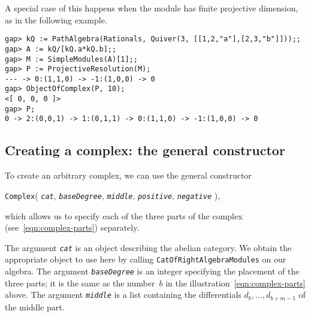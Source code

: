 \documentclass{amsart}
\theoremstyle{definition}
\newcommand{\code}[1]{\texttt{#1}}
\newcommand{\Arg}[1]{\texttt{\textit{#1}}}
\theoremstyle{theoretic}
\begin{document}
A special case of this happens when the module has finite projective
dimension, as in the following example.

\begin{verbatim}
gap> kQ := PathAlgebra(Rationals, Quiver(3, [[1,2,"a"],[2,3,"b"]]));;
gap> A := kQ/[kQ.a*kQ.b];;
gap> M := SimpleModules(A)[1];;
gap> P := ProjectiveResolution(M);
--- -> 0:(1,1,0) -> -1:(1,0,0) -> 0
gap> ObjectOfComplex(P, 10);
<[ 0, 0, 0 ]>
gap> P;
0 -> 2:(0,0,1) -> 1:(0,1,1) -> 0:(1,1,0) -> -1:(1,0,0) -> 0
\end{verbatim}


\subsection{Creating a complex: the general constructor}

To create an arbitrary complex, we can use the general constructor
\begin{center}
\code{Complex}( \Arg{cat}, \Arg{baseDegree},
                \Arg{middle}, \Arg{positive}, \Arg{negative} ),
\end{center}
which allows us to specify each of the three parts of the complex
(see~\eqref{eqn:complex-parts}) separately.

The argument \Arg{cat} is an object describing the abelian category.
We obtain the appropriate object to use here by calling
\code{CatOfRightAlgebraModules} on our algebra.
The argument \Arg{baseDegree} is an integer specifying the placement
of the three parts; it is the same as the number~$b$ in the
illustration~\eqref{eqn:complex-parts} above.
The argument \Arg{middle} is a list containing the differentials $d_b,
\ldots, d_{b+m-1}$ of the middle part.
\end{document}
